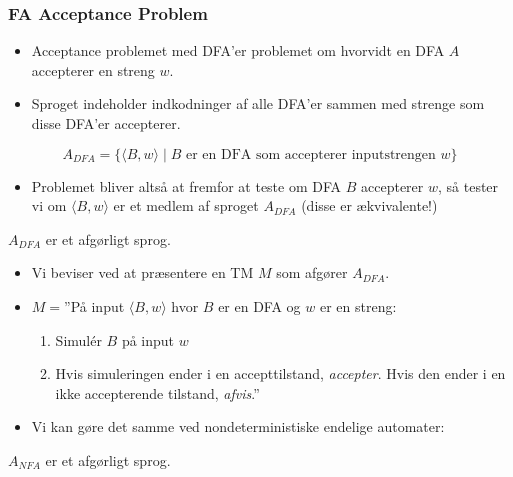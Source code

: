 \begin{frame}[allowframebreaks]
	\frametitle{FA Acceptance Problem}
	\begin{itemize}
		\item Acceptance problemet med DFA'er problemet om hvorvidt en DFA $A$ accepterer en streng $w$.
		\item Sproget indeholder indkodninger af alle DFA'er sammen med strenge som disse DFA'er accepterer.
	\end{itemize}
	\begin{equation*}
		A_{DFA} = \{\langle B, w \rangle \mid B \text{ er en DFA som accepterer inputstrengen }w\}
	\end{equation*}

	\begin{itemize}
		\item Problemet bliver altså at fremfor at teste om DFA $B$ accepterer $w$, så tester vi om $\langle B, w \rangle$ er et medlem af sproget $A_{DFA}$ (disse er ækvivalente!)
	\end{itemize}

	\begin{theorem}
		$A_{DFA}$ er et afgørligt sprog.
	\end{theorem}

	\begin{itemize}
		\item Vi beviser ved at præsentere en TM $M$ som afgører $A_{DFA}$.
		\item $M = $''På input \(\langle B , w \rangle\) hvor $B$ er en DFA og $w$ er en streng:
		      \begin{enumerate}
			      \item Simulér $B$ på input $w$
			      \item Hvis simuleringen ender i en accepttilstand, \textit{accepter}. Hvis den ender i en ikke accepterende tilstand, \textit{afvis}.''
		      \end{enumerate}
	\end{itemize}
	\begin{itemize}
		\item Vi kan gøre det samme ved nondeterministiske endelige automater:
	\end{itemize}

	\begin{theorem}
		$A_{NFA}$ er et afgørligt sprog.
	\end{theorem}


\end{frame}
